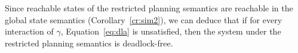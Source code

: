 Since reachable states of the restricted planning semantics are reachable 
in the global state semantics (Corollary~\ref{cr:sim2}), we can deduce that if for
every interaction of $\gamma$, Equation~\ref{eq:dla} is unsatisfied, then the system
under the restricted planning semantics is deadlock-free.


